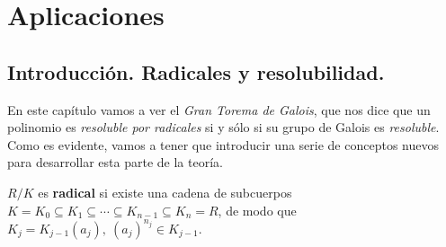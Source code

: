 
\chapter{Aplicaciones}

\section{Introducción. Radicales y resolubilidad.}

En este capítulo vamos a ver el \textit{Gran Torema de Galois}, que nos dice que un polinomio es \textit{resoluble por radicales} si y sólo si su grupo de Galois es \textit{resoluble}. Como es evidente, vamos a tener que introducir una serie de conceptos nuevos para desarrollar esta parte de la teoría.

\begin{dfn}[Radical]
    $R/K$ es \textbf{radical} si existe una cadena de subcuerpos $K = K_0 \subseteq K_1 \subseteq \cdots \subseteq K_{n-1} \subseteq K_n = R$, de modo que $K_j = K_{j-1}(a_j),\ (a_j)^{n_j} \in K_{j-1}$.

    \begin{center}
        \\
    \end{center}
\end{dfn}

